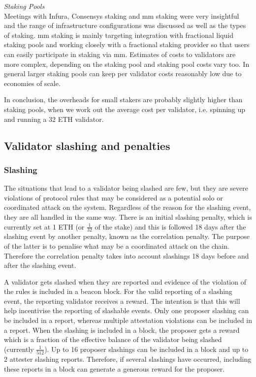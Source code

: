 \documentclass[UTF8]{article}
\begin{document}
\noindent
\textit{Staking Pools}\\
Meetings with Infura, Consensys staking and  \gls{mm} staking were very insightful and the range of infrastructure configurations was discussed as well as the types of staking. \gls{mm} staking is mainly targeting integration with fractional liquid staking pools and working closely with a fractional staking provider so that users can easily participate in staking via \gls{mm}.
Estimates of costs to validators are more complex, depending on the staking pool and staking pool costs vary too. In general larger staking pools can keep per validator costs reasonably low due to economies of scale.

In conclusion, the overheads for small stakers are probably slightly higher than staking pools, when we work out the average cost per validator, i.e. spinning up and running a 32 ETH validator. 

\subsection{Validator slashing and penalties}
\label{slashing}
\subsubsection*{Slashing}
The situations that lead to a validator being slashed are few, but they are severe violations of protocol rules that may be considered as a potential solo or coordinated attack on the system. Regardless of the reason for the slashing event, they are all handled in the same way. There is an initial slashing penalty, which is currently set at 1 ETH (or $\frac{1}{32}$ of the stake) and this is followed 18 days after the slashing event by another penalty, known as the correlation penalty. The purpose of the latter is to penalise what may be a coordinated attack on the chain. Therefore the correlation penalty takes into account slashings 18 days before and after the slashing event. 

A validator gets slashed when they are reported and evidence of the violation of the rules is included in a beacon block. For the valid reporting of a slashing event, the reporting validator receives a reward. The intention is that this will help incentivise the reporting of slashable events. Only one proposer slashing can be included in a report, whereas multiple attestation violations can be included in a report. When the slashing is included in a block, the proposer gets a reward which is a fraction of the effective balance of the validator being slashed (currently $\frac{1}{512}$). Up to 16 proposer slashings can be included in a block and up to 2 attester slashing reports.  Therefore, if several slashings have occurred, including these reports in a block can generate a generous reward for the proposer. 
\end{document}
